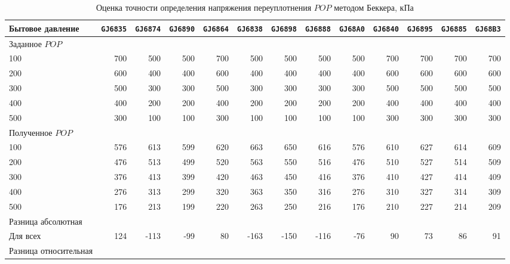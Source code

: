 \begin{sidewaystable}[p]
    \centering
    \small
    \caption{Оценка точности определения напряжения переуплотнения $POP$ методом Беккера, кПа} \label{tab:pop-beck}
    \begin{tabular}{@{}lrrrrrrrrrrrr@{}}
    \toprule
    Бытовое давление & \texttt{GJ6835} & \texttt{GJ6874} & \texttt{GJ6890} & \texttt{GJ6864} & \texttt{GJ6838} & \texttt{GJ6898} & \texttt{GJ6888} & \texttt{GJ68A0} & \texttt{GJ6840} & \texttt{GJ6895} & \texttt{GJ6885} & \texttt{GJ68B3} \\
    \midrule
    Заданное $POP$ &  &  &  &  &  &  &  &  &  &  &  &  \\
    100 & 700 & 500 & 500 & 700 & 500 & 500 & 500 & 500 & 700 & 700 & 700 & 700 \\
    200 & 600 & 400 & 400 & 600 & 400 & 400 & 400 & 400 & 600 & 600 & 600 & 600 \\
    300 & 500 & 300 & 300 & 500 & 300 & 300 & 300 & 300 & 500 & 500 & 500 & 500 \\
    400 & 400 & 200 & 200 & 400 & 200 & 200 & 200 & 200 & 400 & 400 & 400 & 400 \\
    500 & 300 & 100 & 100 & 300 & 100 & 100 & 100 & 100 & 300 & 300 & 300 & 300 \\
    \midrule
    Полученное $POP$ &  &  &  &  &  &  &  &  &  &  &  &  \\
    100 & 576 & 613 & 599 & 620 & 663 & 650 & 616 & 576 & 610 & 627 & 614 & 609 \\
    200 & 476 & 513 & 499 & 520 & 563 & 550 & 516 & 476 & 510 & 527 & 514 & 509 \\
    300 & 376 & 413 & 399 & 420 & 463 & 450 & 416 & 376 & 410 & 427 & 414 & 409 \\
    400 & 276 & 313 & 299 & 320 & 363 & 350 & 316 & 276 & 310 & 327 & 314 & 309 \\
    500 & 176 & 213 & 199 & 220 & 263 & 250 & 216 & 176 & 210 & 227 & 214 & 209 \\
    \midrule
    Разница абсолютная &  &  &  &  &  &  &  &  &  &  &  &  \\
    Для всех & 124 & -113 & -99 & 80 & -163 & -150 & -116 & -76 & 90 & 73 & 86 & 91 \\
    \midrule
    Разница относительная &  &  &  &  &  &  &  &  &  &  &  &  \\

\end{tabular}
\end{sidewaystable}
